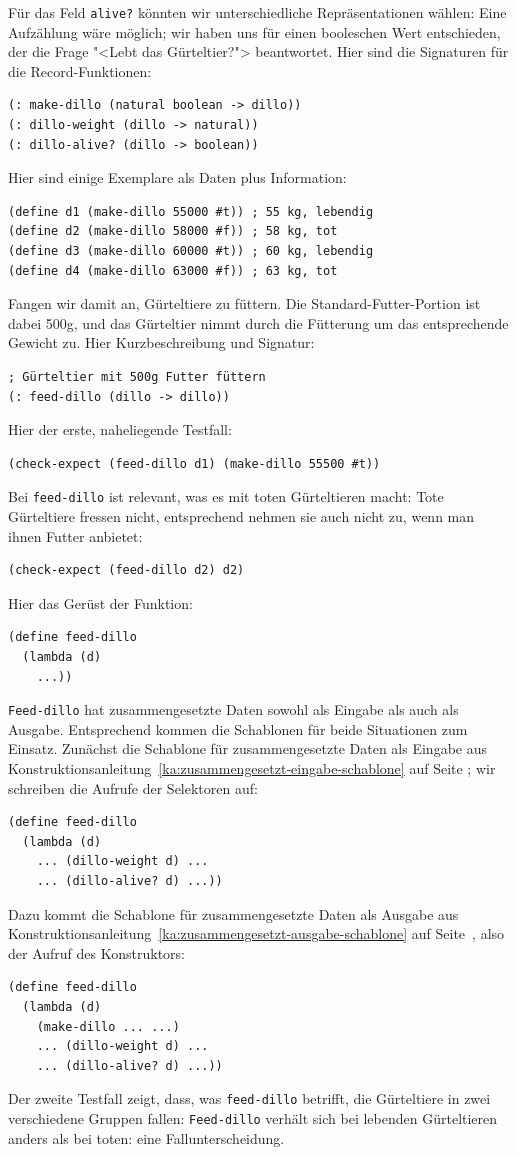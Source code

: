 Für das Feld \texttt{alive?} könnten wir unterschiedliche Repräsentationen
wählen: Eine Aufzählung wäre möglich; wir haben uns für einen
booleschen Wert entschieden, der die Frage "<Lebt das Gürteltier?">
beantwortet.  Hier sind die Signaturen für die Record-Funktionen:
%
\begin{verbatim}
(: make-dillo (natural boolean -> dillo))
(: dillo-weight (dillo -> natural))
(: dillo-alive? (dillo -> boolean))
\end{verbatim}
%
Hier sind einige Exemplare als Daten plus Information:
%
\begin{verbatim}
(define d1 (make-dillo 55000 #t)) ; 55 kg, lebendig 
(define d2 (make-dillo 58000 #f)) ; 58 kg, tot
(define d3 (make-dillo 60000 #t)) ; 60 kg, lebendig
(define d4 (make-dillo 63000 #f)) ; 63 kg, tot
\end{verbatim}
%
Fangen wir damit an, Gürteltiere zu füttern.  Die
Standard-Futter-Portion ist dabei 500g, und das Gürteltier nimmt durch
die Fütterung um das entsprechende Gewicht zu.  Hier Kurzbeschreibung
und Signatur:
%
\begin{verbatim}
; Gürteltier mit 500g Futter füttern
(: feed-dillo (dillo -> dillo))
\end{verbatim}
%
Hier der erste, naheliegende Testfall:
%
\begin{verbatim}
(check-expect (feed-dillo d1) (make-dillo 55500 #t))
\end{verbatim}
%
Bei \texttt{feed-dillo} ist relevant, was es mit toten
Gürteltieren macht: Tote Gürteltiere fressen nicht, entsprechend
nehmen sie auch nicht zu, wenn man ihnen Futter anbietet:
%
\begin{verbatim}
(check-expect (feed-dillo d2) d2)
\end{verbatim}
%
Hier das Gerüst der Funktion:
\begin{verbatim}
(define feed-dillo
  (lambda (d)
    ...))
\end{verbatim}
%
\texttt{Feed-dillo} hat zusammengesetzte Daten sowohl als Eingabe
als auch als Ausgabe.  Entsprechend kommen die Schablonen für beide
Situationen zum Einsatz.  Zunächst die Schablone für zusammengesetzte
Daten als Eingabe aus
Konstruktionsanleitung~\ref{ka:zusammengesetzt-eingabe-schablone} auf
Seite \pageref{ka:zusammengesetzt-eingabe-schablone}; wir schreiben die Aufrufe der Selektoren auf:
%
\begin{verbatim}
(define feed-dillo
  (lambda (d)
    ... (dillo-weight d) ...
    ... (dillo-alive? d) ...))
\end{verbatim}
%
Dazu kommt die Schablone für zusammengesetzte Daten als Ausgabe aus
Konstruktionsanleitung~\ref{ka:zusammengesetzt-ausgabe-schablone} auf
Seite~\pageref{ka:zusammengesetzt-ausgabe-schablone}, also
der Aufruf des Konstruktors:
%
\begin{verbatim}
(define feed-dillo
  (lambda (d)
    (make-dillo ... ...)
    ... (dillo-weight d) ...
    ... (dillo-alive? d) ...))
\end{verbatim}
%
Der zweite Testfall zeigt, dass, was \texttt{feed-dillo}
betrifft, die Gürteltiere in zwei verschiedene Gruppen fallen:
\texttt{Feed-dillo} verhält sich bei lebenden Gürteltieren anders als
bei toten: eine Fallunterscheidung.

